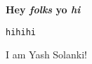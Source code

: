 
\textbf{Hey \textit{folks} yo \textit{hi}}
\begin{verbatim}
hihihi 
\end{verbatim}
I am Yash Solanki!
